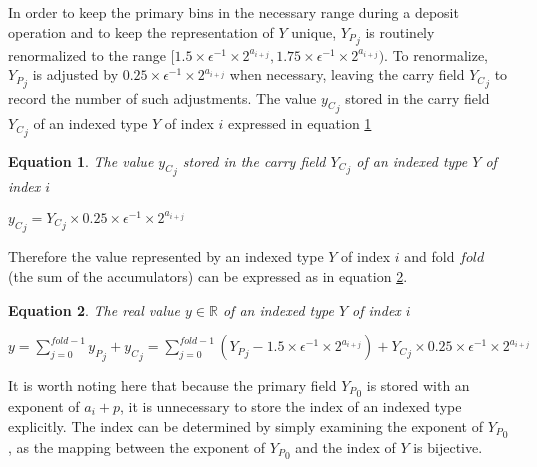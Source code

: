 \documentclass[12pt]{article}
\providecommand{\R}{\ensuremath{\mathbb{R}}}
\theoremstyle{plain}
\newtheorem{eq}{Equation}[section]
\begin{document}
      In order to keep the primary bins in the necessary range during a deposit operation and to keep the representation of $Y$ unique, ${Y_P}_j$ is routinely renormalized to the range $[1.5 \times\epsilon^{-1} \times 2^{a_{i + j}}, 1.75 \times\epsilon^{-1} \times 2^{a_{i + j}})$.
      To renormalize, ${Y_P}_j$ is adjusted by $0.25 \times\epsilon^{-1} \times 2^{a_{i + j}}$ when necessary, leaving the carry field ${Y_C}_j$ to record the number of such adjustments.
      The value ${y_C}_j$ stored in the carry field ${Y_C}_j$ of an indexed type $Y$ of index $i$ expressed in equation \ref{eq:car}
      \begin{eq} The value ${y_C}_j$ stored in the carry field ${Y_C}_j$ of an indexed type $Y$ of index $i$

        ${y_C}_j = {Y_C}_j \times 0.25\times\epsilon^{-1}\times2^{a_{i + j}}$
        \label{eq:car}
      \end{eq}
 Therefore the value represented by an indexed type $Y$ of index $i$ and fold $fold$ (the sum of the accumulators) can be expressed as in equation \ref{eq:indexedvalue}.
      \begin{eq} The real value $y \in \R$ of an indexed type $Y$ of index $i$

        $y = \sum\limits_{j = 0}^{fold - 1} {y_P}_j + {y_C}_j = \sum\limits_{j = 0}^{fold - 1} ({Y_P}_j - 1.5 \times\epsilon^{-1}\times 2^{a_{i + j}}) + {Y_C}_j \times 0.25\times\epsilon^{-1}\times2^{a_{i + j}}$
        \label{eq:indexedvalue}
      \end{eq}
      It is worth noting here that because the primary field ${Y_P}_0$ is stored with an exponent of $a_i + p$, it is unnecessary to store the index of an indexed type explicitly. The index can be determined by simply examining the exponent of ${Y_P}_0$, as the mapping between the exponent of ${Y_P}_0$ and the index of $Y$ is bijective.
\end{document}
